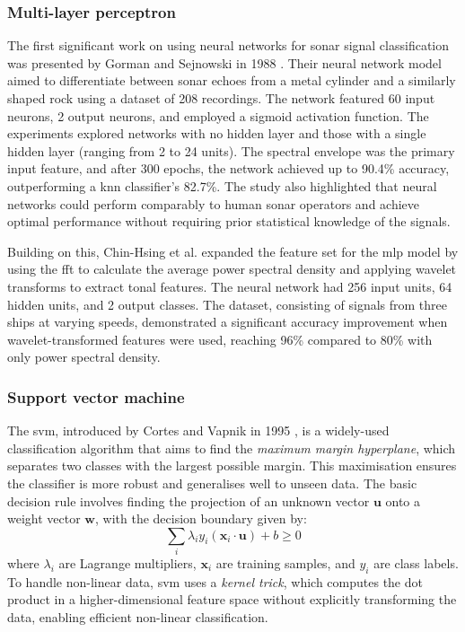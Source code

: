 \subsubsection{Multi-layer perceptron}

The first significant work on using neural networks for sonar signal classification was presented by Gorman and Sejnowski in 1988 \cite{gorman_analysis_1988}. Their neural network model aimed to differentiate between sonar echoes from a metal cylinder and a similarly shaped rock using a dataset of 208 recordings. The network featured 60 input neurons, 2 output neurons, and employed a sigmoid activation function. The experiments explored networks with no hidden layer and those with a single hidden layer (ranging from 2 to 24 units). The spectral envelope was the primary input feature, and after 300 epochs, the network achieved up to 90.4\% accuracy, outperforming a \acrshort{knn} classifier's 82.7\%. The study also highlighted that neural networks could perform comparably to human sonar operators and achieve optimal performance without requiring prior statistical knowledge of the signals.

Building on this, Chin-Hsing et al. \cite{chin-hsing_classification_1998} expanded the feature set for the \acrshort{mlp} model by using the \acrfull{fft} to calculate the average power spectral density and applying wavelet transforms to extract tonal features. The neural network had 256 input units, 64 hidden units, and 2 output classes. The dataset, consisting of signals from three ships at varying speeds, demonstrated a significant accuracy improvement when wavelet-transformed features were used, reaching 96\% compared to 80\% with only power spectral density.

\subsubsection{Support vector machine}

The \acrlong{svm}, introduced by Cortes and Vapnik in 1995 \cite{cortes_support-vector_1995}, is a widely-used classification algorithm that aims to find the \textit{maximum margin hyperplane}, which separates two classes with the largest possible margin. This maximisation ensures the classifier is more robust and generalises well to unseen data. The basic decision rule involves finding the projection of an unknown vector $\bm{u}$ onto a weight vector $\bm{w}$, with the decision boundary given by: 
\begin{equation} 
\sum_i \lambda_i y_i (\bm{x}_i \cdot \bm{u}) + b \geq 0
\end{equation} 
where $\lambda_i$ are Lagrange multipliers, $\bm{x}_i$ are training samples, and $y_i$ are class labels. To handle non-linear data, \acrshort{svm} uses a \textit{kernel trick}, which computes the dot product in a higher-dimensional feature space without explicitly transforming the data, enabling efficient non-linear classification.

